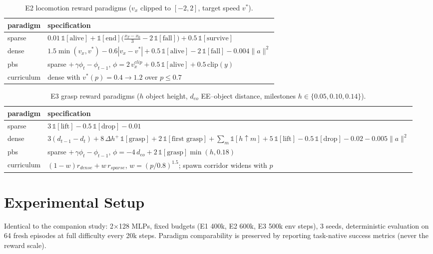 \documentclass[journal,twoside]{IEEEtran}
\begin{document}
\begin{table}[t]
\centering
\caption{E2 locomotion reward paradigms ($v_x$ clipped to $[-2,2]$, target
speed $v^*$).}
\label{tab:hop-r}
\begin{tabular}{lp{5.4cm}}
\toprule
paradigm & specification \\
\midrule
sparse & $0.01\,\mathbb 1[\text{alive}]
+\mathbb 1[\text{end}]\big(\tfrac{x_T-x_0}{3}-2\,\mathbb 1[\text{fall}]\big)
+0.5\,\mathbb 1[\text{survive}]$ \\
dense & $1.5\min(v_x,v^*)-0.6|v_x-v^*|+0.5\,\mathbb 1[\text{alive}]
-2\,\mathbb 1[\text{fall}]-0.004\|a\|^2$ \\
pbs & sparse $+\,\gamma\phi_t-\phi_{t-1}$,
$\phi=2\,v_x^{clip}+0.5\,\mathbb 1[\text{alive}]+0.5\,\mathrm{clip}(y)$ \\
curriculum & dense with $v^*(p)=0.4\to1.2$ over $p\le0.7$ \\
\bottomrule
\end{tabular}
\end{table}

\begin{table}[t]
\centering
\caption{E3 grasp reward paradigms ($h$ object height, $d_{eo}$ EE--object
distance, milestones $h\in\{0.05,0.10,0.14\}$).}
\label{tab:grasp-r}
\begin{tabular}{lp{5.4cm}}
\toprule
paradigm & specification \\
\midrule
sparse & $3\,\mathbb 1[\text{lift}]-0.5\,\mathbb 1[\text{drop}]-0.01$ \\
dense & $3(d_{t-1}-d_t)+8\,\Delta h^+\,\mathbb 1[\text{grasp}]
+2\,\mathbb 1[\text{first grasp}]
+\sum_m \mathbb 1[h\!\uparrow\! m]
+5\,\mathbb 1[\text{lift}]-0.5\,\mathbb 1[\text{drop}]-0.02-0.005\|a\|^2$ \\
pbs & sparse $+\,\gamma\phi_t-\phi_{t-1}$,
$\phi=-4\,d_{eo}+2\,\mathbb 1[\text{grasp}]\min(h,0.18)$ \\
curriculum & $(1-w)r_{dense}+w\,r_{sparse}$, $w=(p/0.8)^{1.5}$;
spawn corridor widens with $p$ \\
\bottomrule
\end{tabular}
\end{table}

\section{Experimental Setup}
Identical to the companion study: 2$\times$128 MLPs, fixed budgets
(E1 400k, E2 600k, E3 500k env steps), 3 seeds, deterministic evaluation on
64 fresh episodes at full difficulty every 20k steps. Paradigm comparability
is preserved by reporting task-native success metrics (never the reward
scale).
\end{document}
